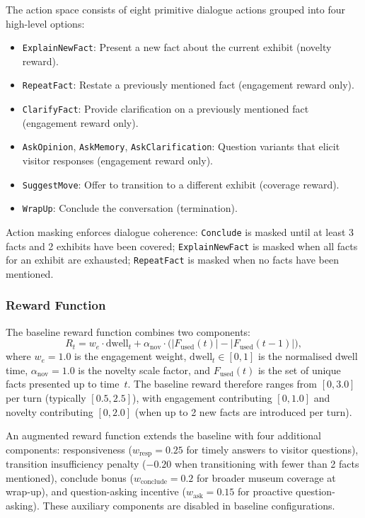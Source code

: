 \documentclass[a4paper, 11pt]{article}
\newcommand{\dwell}{\mathrm{dwell}_t}
\newcommand{\Fused}{F_{\mathrm{used}}}
\begin{document}
The action space consists of eight primitive dialogue actions grouped into four high-level options:
\begin{itemize}
  \item \texttt{ExplainNewFact}: Present a new fact about the current exhibit (novelty reward).
  \item \texttt{RepeatFact}: Restate a previously mentioned fact (engagement reward only).
  \item \texttt{ClarifyFact}: Provide clarification on a previously mentioned fact (engagement reward only).
  \item \texttt{AskOpinion}, \texttt{AskMemory}, \texttt{AskClarification}: Question variants that elicit visitor responses (engagement reward only).
  \item \texttt{SuggestMove}: Offer to transition to a different exhibit (coverage reward).
  \item \texttt{WrapUp}: Conclude the conversation (termination).
\end{itemize}
Action masking enforces dialogue coherence: \texttt{Conclude} is masked until at least 3 facts and 2 exhibits have been covered; \texttt{ExplainNewFact} is masked when all facts for an exhibit are exhausted; \texttt{RepeatFact} is masked when no facts have been mentioned.

\subsubsection{Reward Function}
\label{sec:bg_reward_fn}

The baseline reward function combines two components:
\begin{equation}
  \label{eq:daniel_reward}
  R_t = w_e \cdot \dwell + \alpha_{\mathrm{nov}} \cdot \bigl(|\Fused(t)| - |\Fused(t-1)|\bigr),
\end{equation}
where $w_e = 1.0$ is the engagement weight, $\dwell \in [0,1]$ is the normalised dwell time, $\alpha_{\mathrm{nov}} = 1.0$ is the novelty scale factor, and $\Fused(t)$ is the set of unique facts presented up to time~$t$. The baseline reward therefore ranges from $[0, 3.0]$ per turn (typically $[0.5, 2.5]$), with engagement contributing $[0, 1.0]$ and novelty contributing $[0, 2.0]$ (when up to 2 new facts are introduced per turn).

An augmented reward function extends the baseline with four additional components: responsiveness ($w_{\mathrm{resp}} = 0.25$ for timely answers to visitor questions), transition insufficiency penalty ($-0.20$ when transitioning with fewer than 2 facts mentioned), conclude bonus ($w_{\mathrm{conclude}} = 0.2$ for broader museum coverage at wrap-up), and question-asking incentive ($w_{\mathrm{ask}} = 0.15$ for proactive question-asking). These auxiliary components are disabled in baseline configurations.
\end{document}
